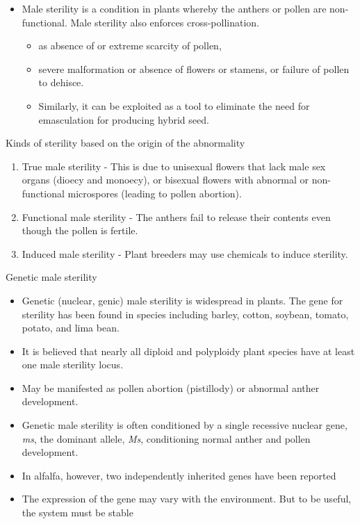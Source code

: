 \documentclass[11pt,ignorenonframetext,aspectratio=169]{beamer}
\providecommand{\tightlist}{%
  \setlength{\itemsep}{0pt}\setlength{\parskip}{0pt}}
\begin{document}
\begin{frame}{}
\protect\hypertarget{section-11}{}
\begin{itemize}
\tightlist
\item
  Male sterility is a condition in plants whereby the anthers or pollen
  are non-functional. Male sterility also enforces cross-pollination.

  \begin{itemize}
  \tightlist
  \item
    as absence of or extreme scarcity of pollen,
  \item
    severe malformation or absence of flowers or stamens, or failure of
    pollen to dehisce.
  \item
    Similarly, it can be exploited as a tool to eliminate the need for
    emasculation for producing hybrid seed.
  \end{itemize}
\end{itemize}
\end{frame}

\begin{frame}{Kinds of sterility based on the origin of the abnormality}
\protect\hypertarget{kinds-of-sterility-based-on-the-origin-of-the-abnormality}{}
\begin{enumerate}
\tightlist
\item
  True male sterility - This is due to unisexual flowers that lack male
  sex organs (dioecy and monoecy), or bisexual flowers with abnormal or
  non-functional microspores (leading to pollen abortion).
\item
  Functional male sterility - The anthers fail to release their contents
  even though the pollen is fertile.
\item
  Induced male sterility - Plant breeders may use chemicals to induce
  sterility.
\end{enumerate}
\end{frame}

\begin{frame}{Genetic male sterility}
\protect\hypertarget{genetic-male-sterility}{}
\begin{itemize}
\tightlist
\item
  Genetic (nuclear, genic) male sterility is widespread in plants. The
  gene for sterility has been found in species including barley, cotton,
  soybean, tomato, potato, and lima bean.
\item
  It is believed that nearly all diploid and polyploidy plant species
  have at least one male sterility locus.
\item
  May be manifested as pollen abortion (pistillody) or abnormal anther
  development.
\item
  Genetic male sterility is often conditioned by a single recessive
  nuclear gene, \emph{ms}, the dominant allele, \emph{Ms}, conditioning
  normal anther and pollen development.
\item
  In alfalfa, however, two independently inherited genes have been
  reported
\item
  The expression of the gene may vary with the environment. But to be
  useful, the system must be stable
\end{itemize}
\end{frame}
\end{document}

